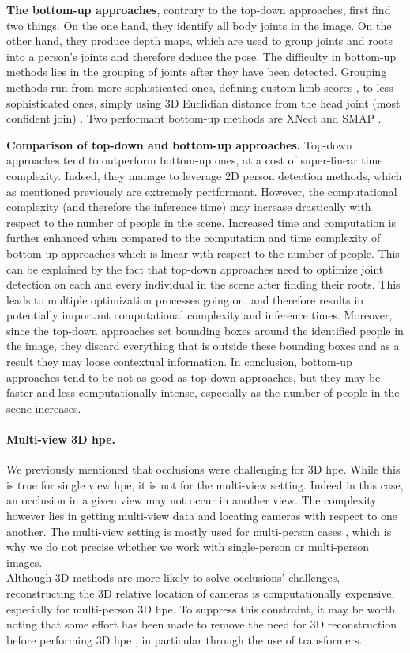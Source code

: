 \documentclass[runningheads]{llncs}
\begin{document}
\textbf{The bottom-up approaches}, contrary to the top-down approaches, first find two things. On the one hand, they identify all body joints in the image. On the other hand, they produce depth maps, which are used to group joints and roots into a person's joints and therefore deduce the pose. The difficulty in bottom-up methods lies in the grouping of joints after they have been detected. Grouping methods run from more sophisticated ones, defining custom limb scores \cite{limb score}, to less sophisticated ones, simply using 3D Euclidian distance from the head joint (most confident join) \cite{bottom up 3D distance}.
Two performant bottom-up methods are XNect \cite{XNect} and SMAP \cite{SMAP}.

\textbf{Comparison of top-down and bottom-up approaches.} Top-down approaches tend to outperform bottom-up ones, at a cost of super-linear time complexity. Indeed, they manage to leverage 2D person detection methods, which as mentioned previously are extremely pertformant. However, the computational complexity (and therefore the inference time) may increase drastically with respect to the number of people in the scene. Increased time and computation is further enhanced when compared to the computation and time complexity of bottom-up approaches which is linear with respect to the number of people. This can be explained by the fact that top-down approaches need to optimize joint detection on each and every individual in the scene after finding their roots. This leads to multiple optimization processes going on, and therefore results in potentially important computational complexity and inference times. Moreover, since the top-down approaches set bounding boxes around the identified people in the image, they discard everything that is outside these bounding boxes and as a result they may loose contextual information. In conclusion, bottom-up approaches tend to be not as good as top-down approaches, but they may be faster and less computationally intense, especially as the number of people in the scene increases.

\paragraph{Multi-view 3D \ac{hpe}.}
We previously mentioned that occlusions were challenging for 3D \ac{hpe}. While this is true for single view \ac{hpe}, it is not for the multi-view setting. Indeed in this case, an occlusion in a given view may not occur in another view. The complexity however lies in getting multi-view data and locating cameras with respect to one another. The multi-view setting is mostly used for multi-person cases \cite{survey}, which is why we do not precise whether we work with single-person or multi-person images. \\
Although 3D methods are more likely to solve occlusions' challenges, reconstructing the 3D relative location of cameras is computationally expensive, especially for multi-person 3D \ac{hpe}. To suppress this constraint, it may be worth noting that some effort has been made to remove the need for 3D reconstruction before performing 3D \ac{hpe} \cite{Multi-view Pose transformer}, in particular through the use of transformers.
\end{document}

